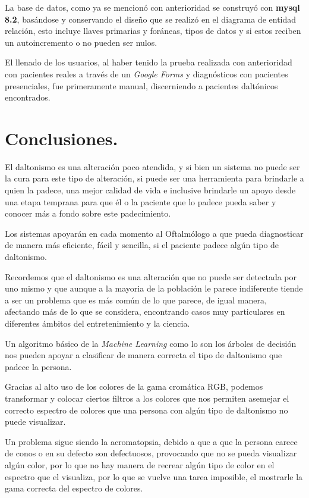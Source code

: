 \documentclass[10pt]{article}
\begin{document}
La base de datos, como ya se mencionó con anterioridad se construyó con \textbf{mysql 8.2}, basándose y conservando el diseño que se realizó en el diagrama de entidad relación, esto incluye llaves primarias y foráneas, tipos de datos y si estos reciben un autoincremento o no pueden ser nulos.

El llenado de los usuarios, al haber tenido la prueba realizada con anterioridad con pacientes reales a través de un \textit{Google Forms} y diagnósticos con pacientes presenciales, fue primeramente manual, discerniendo a pacientes daltónicos encontrados.


\newpage
\section{Conclusiones.}

El daltonismo es una alteración poco atendida, y si bien un sistema no puede ser la cura para este tipo de alteración, si puede ser una herramienta para brindarle a quien la padece, una mejor calidad de vida e inclusive brindarle un apoyo desde una etapa temprana para que él o la paciente que lo padece pueda saber y conocer más a fondo sobre este padecimiento.

Los sistemas apoyarán en cada momento al Oftalmólogo a que pueda diagnosticar de manera más eficiente, fácil y sencilla, si el paciente padece algún tipo de daltonismo.

Recordemos que el daltonismo es una alteración que no puede ser detectada por uno mismo y que aunque a la mayoria de la población le parece indiferente tiende a ser un problema que es más común de lo que parece, de igual manera, afectando más de lo que se considera, encontrando casos muy particulares en diferentes ámbitos del entretenimiento y la ciencia.

Un algoritmo básico de la \textit{Machine Learning} como lo son los árboles de decisión nos pueden apoyar a clasificar de manera correcta el tipo de daltonismo que padece la persona.

Gracias al alto uso de los colores de la gama cromática RGB, podemos transformar y colocar ciertos filtros a los colores que nos permiten asemejar el correcto espectro de colores que una persona con algún tipo de daltonismo no puede visualizar.

Un problema sigue siendo la acromatopsia, debido a que a que la persona carece de conos o en su defecto son defectuosos, provocando que no se pueda visualizar algún color, por lo que no hay manera de recrear algún tipo de color en el espectro que el visualiza, por lo que se vuelve una tarea imposible, el mostrarle la gama correcta del espectro de colores.
\end{document}
